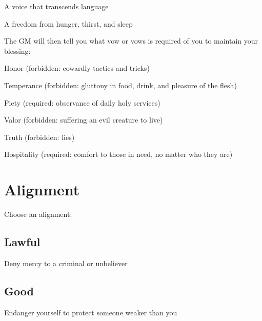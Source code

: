  
\item A voice that transcends language

 
\item A freedom from hunger, thirst, and sleep


\stopitemize
 

The GM will then tell you what vow or vows is required of you to maintain your blessing:

 
\startitemize[1,packed]

\item Honor (forbidden: cowardly tactics and tricks)

 
\item Temperance (forbidden: gluttony in food, drink, and pleasure of the flesh)

 
\item Piety (required: observance of daily holy services)

 
\item Valor (forbidden: suffering an evil creature to live)

 
\item Truth (forbidden: lies)

 
\item Hospitality (required: comfort to those in need, no matter who they are)


\stopitemize




 
\section{Alignment}   
 
\startInstructionsAfterHeader
Choose an alignment:
\stopInstructionsAfterHeader
 


\subsection{Lawful}   
 

Deny mercy to a criminal or unbeliever

 
\subsection{Good}   
 

Endanger yourself to protect someone weaker than you



